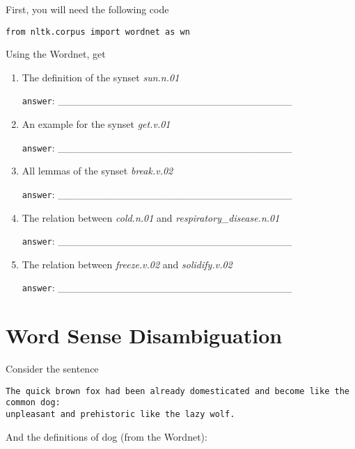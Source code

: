 \documentclass[a4paper,11pt]{scrartcl}
\begin{document}
First, you will need the following code 

{\singlespacing
\begin{verbatim}
from nltk.corpus import wordnet as wn
\end{verbatim}
}

Using the Wordnet, get

\begin{enumerate}[label=\alph*)]
\singlespacing%

\item The definition of the synset \textit{sun.n.01}

\verb|answer|: \_\_\_\_\_\_\_\_\_\_\_\_\_\_\_\_\_\_\_\_\_\_\_\_\_\_\_\_\_\_\_\_

\item An example for the synset \textit{get.v.01}

\verb|answer|: \_\_\_\_\_\_\_\_\_\_\_\_\_\_\_\_\_\_\_\_\_\_\_\_\_\_\_\_\_\_\_\_

\item All lemmas of the synset \textit{break.v.02}

\verb|answer|: \_\_\_\_\_\_\_\_\_\_\_\_\_\_\_\_\_\_\_\_\_\_\_\_\_\_\_\_\_\_\_\_

\item The relation between \textit{cold.n.01} and \textit{respiratory\_disease.n.01}

\verb|answer|: \_\_\_\_\_\_\_\_\_\_\_\_\_\_\_\_\_\_\_\_\_\_\_\_\_\_\_\_\_\_\_\_

\item The relation between \textit{freeze.v.02} and \textit{solidify.v.02}

\verb|answer|: \_\_\_\_\_\_\_\_\_\_\_\_\_\_\_\_\_\_\_\_\_\_\_\_\_\_\_\_\_\_\_\_

\end{enumerate}


\section{Word Sense Disambiguation}

Consider the sentence

\begin{verbatim}
The quick brown fox had been already domesticated and become like the common dog:
unpleasant and prehistoric like the lazy wolf.
\end{verbatim}

And the definitions of dog (from the Wordnet):
\end{document}
